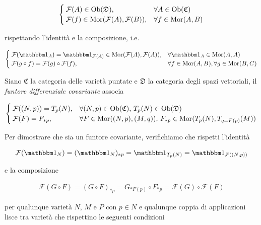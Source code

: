 \begin{equation}
	\begin{cases}
		\mathcal{F}(A) \in \operatorname{Ob}(\mathfrak{D}), & \forall A \in \operatorname{Ob}(\mathfrak{C}) \\
		\mathcal{F}(f) \in \operatorname{Mor}(\mathcal{F}(A),\mathcal{F}(B)), & \forall f \in \operatorname{Mor}(A,B)
	\end{cases}
\end{equation}

rispettando l'identità e la composizione, i.e.

\begin{equation}
	\begin{cases}
		\mathcal{F}(\bigone_{A}) = \bigone_{\mathcal{F}(A)} \in \mor(\mathcal{F}(A),\mathcal{F}(A)), & \forall \bigone_{A} \in \mor(A,A) \\
		\mathcal{F}(g \circ f) = \mathcal{F}(g) \circ \mathcal{F}(f), & \forall f \in \mor(A,B), \forall g \in \mor(B,C)
	\end{cases}
\end{equation}

Siano $ \mathfrak{C} $ la categoria delle varietà puntate e $ \mathfrak{D} $ la categoria degli spazi vettoriali, il \textit{funtore differenziale covariante} associa

\begin{equation}
	\begin{cases}
		\mathcal{F}((N,p)) = T_{p}(N), & \forall (N,p) \in \operatorname{Ob}(\mathfrak{C}), \, T_{p}(N) \in \operatorname{Ob}(\mathfrak{D}) \\
		\mathcal{F}(F) = F_{*p}, & \forall F \in \operatorname{Mor}((N,p),(M,q)), \, F_{*p} \in \operatorname{Mor}(T_{p}(N),T_{q=F(p)}(M))
	\end{cases}
\end{equation}

Per dimostrare che sia un funtore covariante, verifichiamo che rispetti l'identità

\begin{align}
	\mathcal{F}(\bigone_{N}) = (\bigone_{N})_{*p} %
	= \bigone_{T_{p}(N)} %
	= \bigone_{\mathcal{F}((N,p))}
\end{align}

e la composizione

\begin{align}
	\mathcal{F}(G \circ F) = (G \circ F)_{*p} %
	= G_{*F(p)} \circ F_{*p} %
	= \mathcal{F}(G) \circ \mathcal{F}(F)
\end{align}

per qualunque varietà $ N $, $ M $ e $ P $ con $ p \in N $ e qualunque coppia di applicazioni lisce tra varietà che rispettino le seguenti condizioni

